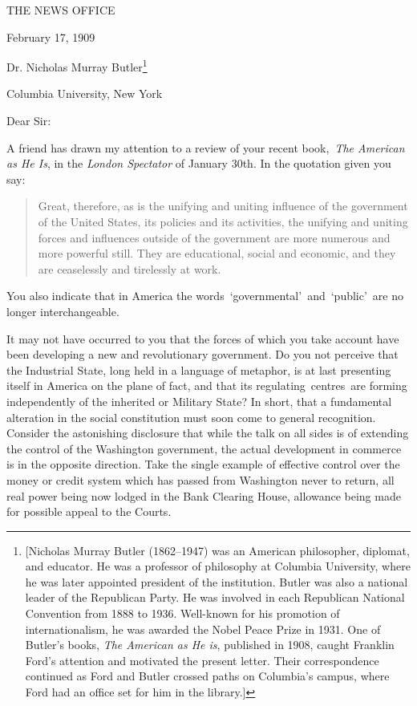 \documentclass[openany,nobib]{tufte-book}
\begin{document}
\vspace{0.5in}

\begin{center}

{\Large THE NEWS OFFICE}

\end{center}

\hfill February 17, 1909~

\vspace{.2in}

\noindent Dr. Nicholas Murray Butler\footnote{{[}Nicholas Murray
  Butler (1862--1947) was an American philosopher, diplomat,
  and educator. He was a professor
  of philosophy at Columbia University, where he was later appointed
  president of the institution. Butler was also a national leader of the
  Republican Party. He was involved in each Republican National
  Convention from 1888 to 1936. Well-known for his promotion
  of internationalism, he was awarded the Nobel Peace Prize in 1931. One
  of Butler's books, \emph{The American as He is}, published in
  1908, caught Franklin Ford's attention
  and motivated the present letter. Their correspondence continued as
  Ford and Butler crossed paths on Columbia's campus, where Ford had an
  office set for him in the library.{]}} 

Columbia University, New York~

\vspace{0.1in}

\noindent Dear Sir:~

A friend has drawn my attention to a review of your recent
book,~\emph{The American as He Is}, in the \emph{London Spectator} of
January 30th. In the quotation given you say:~

\begin{quote}
Great, therefore, as is the unifying and uniting influence of the
government of the United States, its policies and its activities, the
unifying and uniting forces and influences outside of the government are
more numerous and more powerful still. They are educational, social and
economic, and they are ceaselessly and tirelessly at work.~
\end{quote}

\noindent You also indicate that in America the
words~`governmental'~and~`public'~are no longer interchangeable.~

It may not have occurred to you that the forces of which you take
account have been developing a new and revolutionary government. Do you
not perceive that the Industrial State, long held in a language of
metaphor, is at last presenting itself in America on the plane of fact,
and that its regulating~centres~are forming independently of the
inherited or Military State? In short, that a fundamental alteration in
the social constitution must soon come to general recognition. Consider
the astonishing disclosure that while the talk on all sides is of
extending the control of the Washington government, the actual
development in commerce is in the opposite direction. Take the single
example of effective control over the money or credit system which has
passed from Washington never to return, all real power being now lodged
in the Bank Clearing House, allowance being made for possible appeal to
the Courts.~
\end{document}
